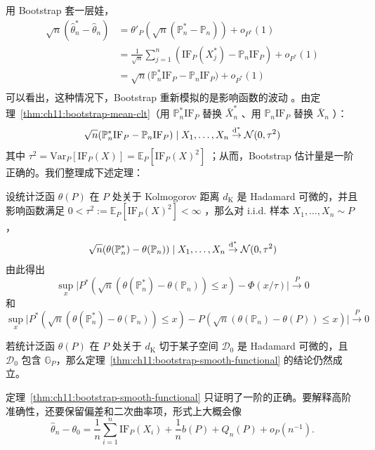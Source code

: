 用 Bootstrap 套一层娃，
\[\begin{aligned} \sqrt n(\widehat\theta_n^*-\widehat\theta_n)&=\theta'_P(\sqrt n(\mathbb P_n^*-\mathbb P_n))+o_{P^*}(1)\\ &=\frac1{\sqrt n}\sum_{j=1}^n(\mathrm{IF}_P(X_j^*)-\mathbb P_n\mathrm{IF}_P)+o_{P^*}(1)\\  &=\sqrt n\big(\mathbb P_n^*\mathrm{IF}_P-\mathbb P_n \mathrm{IF}_P\big)+o_{P^*}(1)\\ \end{aligned}\]
可以看出，这种情况下，Bootstrap 重新模拟的是影响函数的波动 。由定理~\ref{thm:ch11:bootstrap-mean-clt}（用 $\mathbb P_n^*\mathrm{IF}_P$ 替换 $\bar X_n^*$ 、用 $\mathbb P_n\mathrm{IF}_P$ 替换 $\bar X_n$ ）：
\[ \sqrt{n}(\mathbb P_n^*\mathrm{IF}_P-\mathbb P_n \mathrm{IF}_P) \mid X_1,\ldots,X_n \overset{\rm d^*}\to \mathcal{N}(0,\tau^2) \]其中 $\tau^2=\mathrm{Var}_P[\mathrm{IF}_P(X)]=\mathbb{E}_P[\mathrm{IF}_P(X)^2]$ ；从而，Bootstrap 估计量是一阶正确的。我们整理成下述定理：

\begin{theorem}
\label{thm:ch11:bootstrap-smooth-functional}

设统计泛函 $\theta(P)$ 在 $P$ 处关于 Kolmogorov 距离 $d_{\text{K}}$ 是 Hadamard 可微的，并且影响函数满足 $0<\tau^2:=\mathbb E_P[\mathrm{IF}_P(X)^2]<\infty$ ，那么对 i.i.d. 样本 $X_1,\dots,X_n\sim P$ ，
\[\sqrt n(\theta(\mathbb P_n^*)-\theta(\mathbb P_n))\mid X_1,\dots,X_n\overset{\rm d^*}\to\mathcal N(0,\tau^2)\]
由此得出
\[\sup_x \Big| P^*\!\left(\sqrt{n}(\theta(\mathbb P_n^*)-\theta(\mathbb P_n))\leq x\right) -\Phi(x/\tau) \Big| \overset{P}\to 0\]
和
\[\sup_x \Big| P^*\!\left(\sqrt{n}(\theta(\mathbb P_n^*)-\theta(\mathbb P_n))\leq x\right) - P\!\left(\sqrt{n}(\theta(\mathbb P_n)-\theta(P))\leq x\right) \Big| \overset{P}\to 0\]
\end{theorem}

\begin{remark}
若统计泛函 $\theta(P)$ 在 $P$ 处关于 $d_{\text{K}}$ 切于某子空间 $\mathscr D_0$ 是 Hadamard 可微的，且 $\mathscr D_0$ 包含 $\mathbb G_P$，那么定理~\ref{thm:ch11:bootstrap-smooth-functional} 的结论仍然成立。
\end{remark}

定理~\ref{thm:ch11:bootstrap-smooth-functional} 只证明了一阶的正确。要解释高阶准确性，还要保留偏差和二次曲率项，形式上大概会像
\[
\widehat{\theta}_n-\theta_0=\frac{1}{n}\sum_{i=1}^n\mathrm{IF}_P(X_i)+\frac{1}{n}b(P)+Q_n(P)+o_{P}(n^{-1}).
\]

